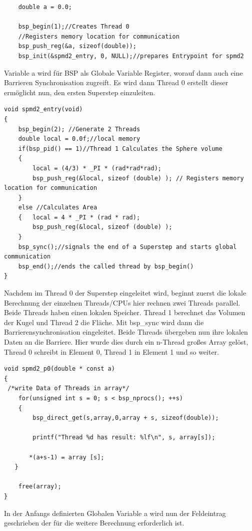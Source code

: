 \documentclass[a4paper,10pt]{scrartcl}
\begin{document}
\begin{lstlisting}
    double a = 0.0;
    
    bsp_begin(1);//Creates Thread 0  
    //Registers memory location for communication  
    bsp_push_reg(&a, sizeof(double));   
    bsp_init(&spmd2_entry, 0, NULL);//prepares Entrypoint for spmd2    
\end{lstlisting}
Variable a wird für BSP als Globale Variable Register, worauf dann auch eine Barrieren Synchronisation zugreift. Es wird dann Thread 0  erstellt dieser ermöglicht nun, den ersten Superstep einzuleiten.

\begin{lstlisting}
void spmd2_entry(void)
{    
    bsp_begin(2); //Generate 2 Threads
    double local = 0.0f;//local memory
    if(bsp_pid() == 1)//Thread 1 Calculates the Sphere volume
    {       
        local = (4/3) * _PI * (rad*rad*rad);
        bsp_push_reg(&local, sizeof (double) ); // Registers memory location for communication
    }    
    else //Calculates Area
    {   local = 4 * _PI * (rad * rad);
        bsp_push_reg(&local, sizeof (double) );
    }    
    bsp_sync();//signals the end of a Superstep and starts global communication
    bsp_end();//ends the called thread by bsp_begin()
} 

\end{lstlisting}
Nachdem im Thread 0 der Superstep eingeleitet wird, beginnt zuerst die lokale Berechnung der einzelnen Threads/CPUs hier rechnen zwei Threads parallel. Beide Threads haben einen lokalen Speicher. Thread 1 berechnet das Volumen der Kugel und Thread 2 die Fläche. Mit bsp\_sync wird dann die Barrierensynchronisation eingeleitet. Beide Threads übergeben nun ihre lokalen Daten an die Barriere. Hier wurde dies durch ein n-Thread großes Array gelöst, Thread 0 schreibt in Element 0, Thread 1 in Element 1 und so weiter.

\newpage

\begin{lstlisting}
void spmd2_p0(double * const a)
{
 /*write Data of Threads in array*/
    for(unsigned int s = 0; s < bsp_nprocs(); ++s)
    {
        bsp_direct_get(s,array,0,array + s, sizeof(double));
        
        printf("Thread %d has result: %lf\n", s, array[s]);
        
       *(a+s-1) = array [s]; 
   }
    
    free(array);
}
\end{lstlisting}
In der Anfangs definierten Globalen Variable a wird nun der Feldeintrag geschrieben der für die weitere Berechnung erforderlich ist.
\end{document}
